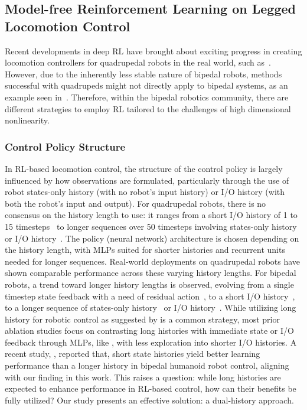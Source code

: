 \subsection{Model-free Reinforcement Learning on Legged Locomotion Control}
Recent developments in deep RL have brought about exciting progress in creating locomotion controllers for quadrupedal robots in the real world, such as~\cite{margolisyang2022rapid,chen2022learning,feng2023genloco,fu2023deep}. 
However, due to the inherently less stable nature of bipedal robots, methods successful with quadrupeds might not directly apply to bipedal systems, as an example seen in~\cite{kumar2022adapting}. 
Therefore, within the bipedal robotics community, there are different strategies to employ RL tailored to the challenges of high dimensional nonlinearity.


\subsubsection{Control Policy Structure}
In RL-based locomotion control, the structure of the control policy is largely influenced by how observations are formulated, particularly through the use of robot states-only history (with no robot's input history) or I/O history (with both the robot's input and output).
For quadrupedal robots, there is no consensus on the history length to use: it ranges from a short I/O history of 1 to 15 timesteps~\citep{hwangbo2019learning,escontrela2022adversarial,huang2022creating} to longer sequences over 50 timesteps involving states-only history~\citep{lee2020learning,miki2022learning,shao2021learning} or I/O history~\citep{kumar2021rma}. 
The policy (neural network) architecture is chosen depending on the history length, with MLPs suited for shorter histories and recurrent units needed for longer sequences. 
Real-world deployments on quadrupedal robots have shown comparable performance across these varying history lengths.
For bipedal robots, a trend toward longer history lengths is observed, evolving from a single timestep state feedback with a need of residual action~\citep{xie2018feedback,xie2020learning,rodriguez2021deepwalk,castillo2022reinforcement}, to a short I/O history~\citep{li2021reinforcement}, to a longer sequence of states-only history~\citep{siekmann2020learning} or I/O history~\citep{kumar2022adapting,radosavovic2023learning}. 
While utilizing long history for robotic control as suggested by \cite{peng2018sim} is a common strategy, most prior ablation studies focus on contrasting long histories with immediate state or I/O feedback through MLPs, like \cite{peng2018sim,lee2020learning,kumar2021rma,siekmann2020learning}, with less exploration into shorter I/O histories. 
A recent study, \cite{singh2023learning}, reported that, short state histories yield better learning performance than a longer history in bipedal humanoid robot control, aligning with our finding in this work. 
This raises a question: while long histories are expected to enhance performance in RL-based control, how can their benefits be fully utilized? 
Our study presents an effective solution: a dual-history approach. 



